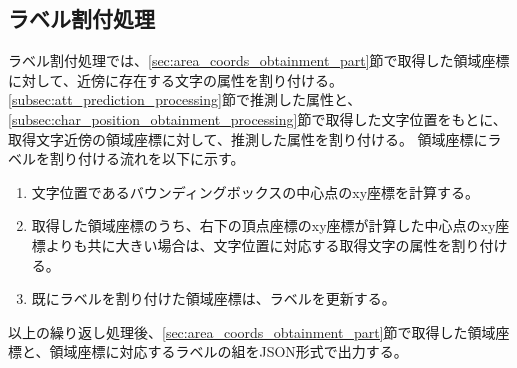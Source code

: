 \subsection{ラベル割付処理}\label{subsec:label_link_processing}
ラベル割付処理では、\ref{sec:area_coords_obtainment_part}節で取得した領域座標に対して、近傍に存在する文字の属性を割り付ける。
\ref{subsec:att_prediction_processing}節で推測した属性と、\ref{subsec:char_position_obtainment_processing}節で取得した文字位置をもとに、取得文字近傍の領域座標に対して、推測した属性を割り付ける。
領域座標にラベルを割り付ける流れを以下に示す。

\begin{enumerate}
    \item 文字位置であるバウンディングボックスの中心点のxy座標を計算する。
    \item 取得した領域座標のうち、右下の頂点座標のxy座標が計算した中心点のxy座標よりも共に大きい場合は、文字位置に対応する取得文字の属性を割り付ける。
    \item 既にラベルを割り付けた領域座標は、ラベルを更新する。
\end{enumerate}

以上の繰り返し処理後、\ref{sec:area_coords_obtainment_part}節で取得した領域座標と、領域座標に対応するラベルの組をJSON形式で出力する。
